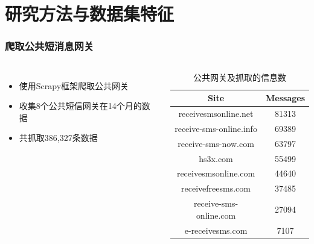 \documentclass[10pt,aspectratio=43,mathserif]{beamer}
\begin{document}
\section[方法]{研究方法与数据集特征}


		\begin{frame}
		  \frametitle{\textbf{爬取公共短消息网关}}
            \begin{columns}
                \footnotesize
                \begin{itemize}
                  \item 使用Scrapy框架爬取公共网关
                  \item 收集8个公共短信网关在14个月的数据
                  \item 共抓取386,327条数据
                \end{itemize}

                \begin{table}
                \caption{公共网关及抓取的信息数}
                \label{table1:gateways}
                \centering
                \footnotesize
                \begin{tabular}{|c|c|}
                \hline
                \textbf{Site}           & \textbf{Messages}\\
                \hline
                receivesmsonline.net    &81313\\
                \hline
                receive-sms-online.info &69389\\
                \hline
                receive-sms-now.com     &63797\\
                \hline
                 hs3x.com               &55499\\
                \hline
                receivesmsonline.com    &44640\\
                \hline
                receivefreesms.com      &37485\\
                \hline
                receive-sms-online.com  &27094\\
                \hline
                 e-receivesms.com       &7107\\
                \hline
                \end{tabular}
                \end{table}
            \end{columns}

		\end{frame}
\end{document}
